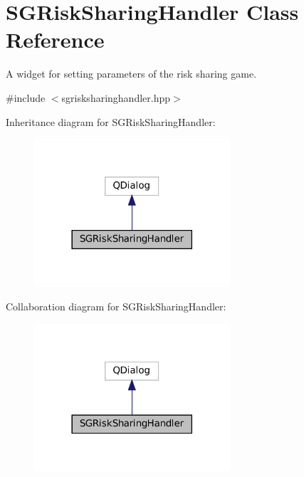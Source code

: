 \hypertarget{classSGRiskSharingHandler}{}\section{S\+G\+Risk\+Sharing\+Handler Class Reference}
\label{classSGRiskSharingHandler}


A widget for setting parameters of the risk sharing game.  




{\ttfamily \#include $<$sgrisksharinghandler.\+hpp$>$}



Inheritance diagram for S\+G\+Risk\+Sharing\+Handler\+:
\nopagebreak
\begin{figure}[H]
\begin{center}
\leavevmode
\includegraphics[width=206pt]{classSGRiskSharingHandler__inherit__graph}
\end{center}
\end{figure}


Collaboration diagram for S\+G\+Risk\+Sharing\+Handler\+:
\nopagebreak
\begin{figure}[H]
\begin{center}
\leavevmode
\includegraphics[width=206pt]{classSGRiskSharingHandler__coll__graph}
\end{center}
\end{figure}
